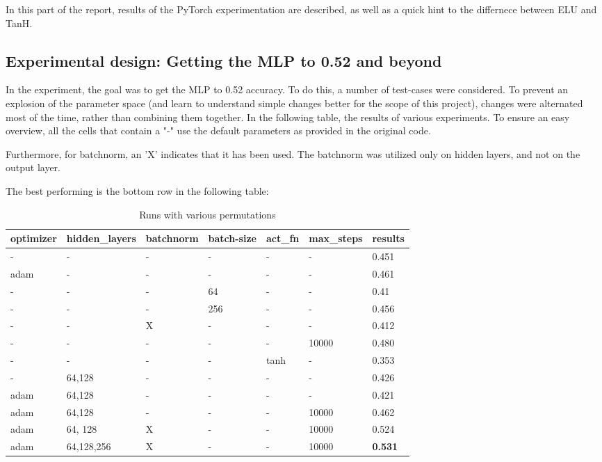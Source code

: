 In this part of the report, results of the PyTorch experimentation are described, as well as a quick hint to the differnece between ELU and TanH.

\subsection{Experimental design: Getting the MLP to 0.52 and beyond}
In the experiment, the goal was to get the MLP to 0.52 accuracy. To do this, a number of test-cases were considered. To prevent an 
explosion of the parameter space (and learn to understand simple changes better for the scope of this project),
changes were alternated most of the time, rather than combining them together. In the following table, the results of various experiments.
To ensure an easy overview, all the cells that contain a "-" use the default parameters as provided in the original code.

Furthermore, for batchnorm, an 'X' indicates that it has been used. The batchnorm was utilized only on hidden layers,
and not on the output layer.

The best performing is the bottom row in the following table:

\begin{table}[h]
    \begin{tabular}{@{}lllllll@{}}
    \toprule
    optimizer & hidden\_layers & batchnorm & batch-size & act\_fn & max\_steps & results \\ \midrule
    -         & -              & -         & -          & -       & -          & 0.451   \\
    adam      & -              & -         & -          & -       & -          & 0.461   \\
    -         & -              & -         & 64         & -       & -          & 0.41    \\
    -         & -              & -         & 256        & -       & -          & 0.456   \\
    -         & -              & X         & -          & -       & -          & 0.412   \\
    -         & -              & -         & -          & -       & 10000      & 0.480   \\
    -         & -              & -         & -          & tanh    & -          & 0.353   \\
    -         & 64,128         & -         & -          & -       & -          & 0.426   \\
    adam      & 64,128         & -         & -          & -       & -          & 0.421   \\
    adam      & 64,128         & -         & -          & -       & 10000      & 0.462   \\
    adam      & 64, 128        & X         & -          & -       & 10000      & 0.524   \\
    adam      & 64,128,256     & X         & -          & -       & 10000      & \textbf{0.531}   \\ \bottomrule
    \end{tabular}
    \caption{Runs with various permutations}
\end{table}

